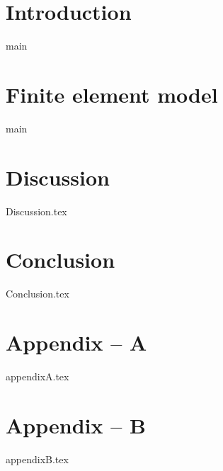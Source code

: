 \documentclass[oneside]{report}
\begin{document}

	\tableofcontents
	\listoffigures
	\clearpage
{}
	\begin{abstract}
		{main}
	\end{abstract}

	\chapter{Introduction}
		{main}
	\chapter{Finite element model}
		{main}
	\chapter{Discussion}
		{Discussion.tex}
	\chapter{Conclusion}
		{Conclusion.tex}
	\clearpage
	
	
	\chapter{Appendix -- A}
		{appendixA.tex}
	\chapter{Appendix -- B}
		{appendixB.tex}
\end{document}

